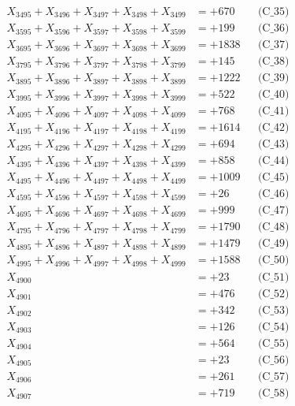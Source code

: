 \documentclass[a4paper,10pt]{article}
\begin{document}
{\begin{align}
X_{3495} + X_{3496} + X_{3497} + X_{3498} + X_{3499} &= +670 && \text{(C\_35)} \\
\allowbreak
X_{3595} + X_{3596} + X_{3597} + X_{3598} + X_{3599} &= +199 && \text{(C\_36)} \\
X_{3695} + X_{3696} + X_{3697} + X_{3698} + X_{3699} &= +1838 && \text{(C\_37)} \\
X_{3795} + X_{3796} + X_{3797} + X_{3798} + X_{3799} &= +145 && \text{(C\_38)} \\
X_{3895} + X_{3896} + X_{3897} + X_{3898} + X_{3899} &= +1222 && \text{(C\_39)} \\
X_{3995} + X_{3996} + X_{3997} + X_{3998} + X_{3999} &= +522 && \text{(C\_40)} \\
\allowbreak
X_{4095} + X_{4096} + X_{4097} + X_{4098} + X_{4099} &= +768 && \text{(C\_41)} \\
X_{4195} + X_{4196} + X_{4197} + X_{4198} + X_{4199} &= +1614 && \text{(C\_42)} \\
X_{4295} + X_{4296} + X_{4297} + X_{4298} + X_{4299} &= +694 && \text{(C\_43)} \\
X_{4395} + X_{4396} + X_{4397} + X_{4398} + X_{4399} &= +858 && \text{(C\_44)} \\
X_{4495} + X_{4496} + X_{4497} + X_{4498} + X_{4499} &= +1009 && \text{(C\_45)} \\
\allowbreak
X_{4595} + X_{4596} + X_{4597} + X_{4598} + X_{4599} &= +26 && \text{(C\_46)} \\
X_{4695} + X_{4696} + X_{4697} + X_{4698} + X_{4699} &= +999 && \text{(C\_47)} \\
X_{4795} + X_{4796} + X_{4797} + X_{4798} + X_{4799} &= +1790 && \text{(C\_48)} \\
X_{4895} + X_{4896} + X_{4897} + X_{4898} + X_{4899} &= +1479 && \text{(C\_49)} \\
X_{4995} + X_{4996} + X_{4997} + X_{4998} + X_{4999} &= +1588 && \text{(C\_50)} \\
\allowbreak
X_{4900} &= +23 && \text{(C\_51)} \\
X_{4901} &= +476 && \text{(C\_52)} \\
X_{4902} &= +342 && \text{(C\_53)} \\
X_{4903} &= +126 && \text{(C\_54)} \\
X_{4904} &= +564 && \text{(C\_55)} \\
\allowbreak
X_{4905} &= +23 && \text{(C\_56)} \\
X_{4906} &= +261 && \text{(C\_57)} \\
X_{4907} &= +719 && \text{(C\_58)} \\

\end{align}}
\end{document}

